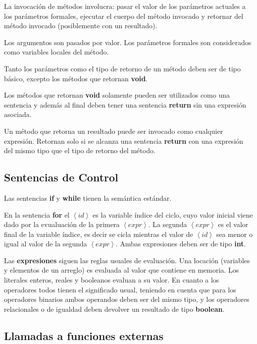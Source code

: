 \documentclass[11pt,a4paper]{article}
\begin{document}
La invocación de métodos involucra: pasar el valor de los parámetros actuales a los parámetros formales, ejecutar el cuerpo del método invocado y retornar del método invocado (posiblemente con un resultado).

Los argumentos son pasados por valor. Los parámetros formales son considerados como variables locales del método. 

Tanto los parámetros como el tipo de retorno de un método deben ser de tipo básico, excepto los métodos que retornan \textbf{void}.

Los métodos que retornan \textbf{void} solamente pueden ser utilizados como una sentencia y además al final deben tener una sentencia \textbf{return} sin una expresión asociada. 

Un método que retorna un resultado puede ser invocado como cualquier expresión. Retornan solo si se alcanza una sentencia \textbf{return} con una expresión del mismo tipo que el tipo de retorno del método.

\subsection{Sentencias de Control}
\label{control}

Las sentencias \textbf{if} y \textbf{while} tienen la semántica estándar. 

En la sentencia \textbf{for} el $\left\langle id \right\rangle$  es la variable índice del ciclo, cuyo valor inicial viene dado por la evualuación de la primera $\left\langle expr \right\rangle$. La segunda $\left\langle expr \right\rangle$ es el valor final de la variable índice, es decir se cicla mientras el valor de $\left\langle id \right\rangle$ sea menor o igual al valor de la segunda $\left\langle expr \right\rangle$. Ambas expresiones deben ser de tipo \textbf{int}. 

Las \textbf{expresiones} siguen las reglas usuales de evaluación. Una locación (variables y elementos de un arreglo) es evaluada al valor que contiene en memoria. Los literales enteros, reales y booleanos evaluan a su valor. En cuanto a los operadores todos tienen el significado usual, teniendo en cuenta que para los operadores binarios ambos operandos deben ser del mismo tipo, y los operadores relacionales o de igualdad deben devolver un resultado de tipo \textbf{boolean}.

\subsection{Llamadas a funciones externas}
\label{externas}
\end{document}

